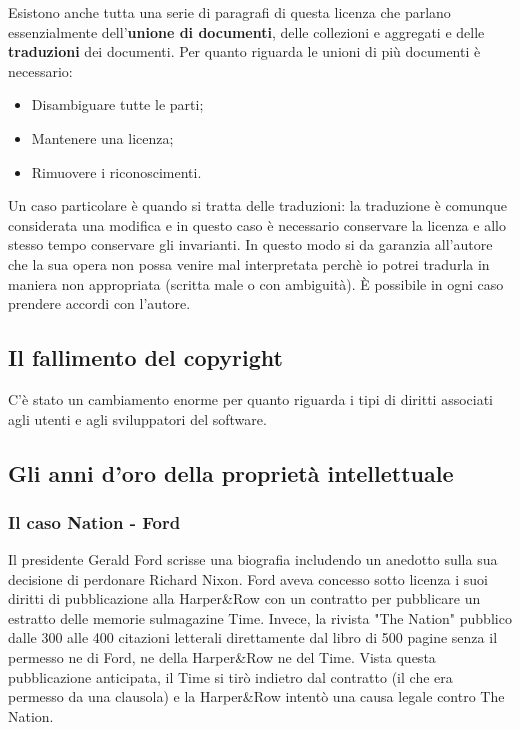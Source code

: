 Esistono anche tutta una serie di paragrafi di questa licenza che parlano essenzialmente dell'\textbf{unione di documenti}, delle collezioni e aggregati e delle \textbf{traduzioni} dei documenti. Per quanto riguarda le unioni di più documenti è necessario:

\begin{itemize}

\item Disambiguare tutte le parti;
\item Mantenere una licenza;
\item Rimuovere i riconoscimenti.

\end{itemize}

Un caso particolare è quando si tratta delle traduzioni: la traduzione è comunque considerata una modifica e in questo caso è necessario conservare la licenza e allo stesso tempo conservare gli invarianti. In questo modo si da garanzia all'autore che la sua opera non possa venire mal interpretata perchè io potrei tradurla in maniera non appropriata (scritta male o con ambiguità). È possibile in ogni caso prendere accordi con l'autore.

\subsection{Il fallimento del copyright}

C'è stato un cambiamento enorme per quanto riguarda i tipi di diritti associati agli utenti e agli sviluppatori del software. 

\subsection{Gli anni d'oro della proprietà intellettuale}
\subsubsection{Il caso Nation - Ford}

Il presidente Gerald Ford scrisse una biografia includendo un anedotto sulla sua decisione di perdonare Richard Nixon. 
Ford aveva concesso sotto licenza i suoi diritti di pubblicazione alla Harper\&Row con un contratto per pubblicare un estratto delle memorie sulmagazine Time. Invece, la rivista "The Nation" pubblico dalle 300 alle 400 citazioni letterali direttamente dal libro di 500 pagine senza il permesso ne di Ford, ne della Harper\&Row ne del Time.
Vista questa pubblicazione anticipata, il Time si tirò indietro dal contratto (il che era permesso da una clausola) e la Harper\&Row intentò una causa legale contro The Nation.

